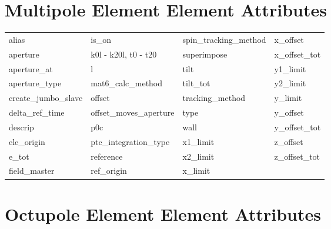  \section{Multipole Element Element Attributes}
 \label{s:list.multipole}
 
 \begin{tabular}{llll} \toprule
alias                       & is_on                       & spin_tracking_method        & x_offset                    \\
aperture                    & k0l - k20l, t0 - t20        & superimpose                 & x_offset_tot                \\
aperture_at                 & l                           & tilt                        & y1_limit                    \\
aperture_type               & mat6_calc_method            & tilt_tot                    & y2_limit                    \\
create_jumbo_slave          & offset                      & tracking_method             & y_limit                     \\
delta_ref_time              & offset_moves_aperture       & type                        & y_offset                    \\
descrip                     & p0c                         & wall                        & y_offset_tot                \\
ele_origin                  & ptc_integration_type        & x1_limit                    & z_offset                    \\
e_tot                       & reference                   & x2_limit                    & z_offset_tot                \\
field_master                & ref_origin                  & x_limit                     &                             \\
 \bottomrule
 \end{tabular}
 \vfill
 
 \section{Octupole Element Element Attributes}
 \label{s:list.octupole}
 
